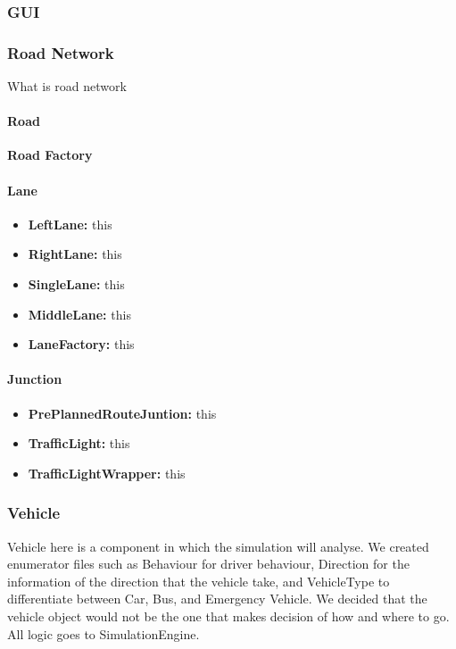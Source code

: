 \documentclass[11pt]{article}
\begin{document}
\subsubsection{GUI}

\subsubsection{Road Network}
What is road network
    \paragraph{Road}
    \textbf{Road Factory}\\
    \paragraph{Lane}
    \begin{itemize}[noitemsep]
    \item \textbf{LeftLane:} this  
    \item \textbf{RightLane:} this
    \item \textbf{SingleLane:} this
    \item \textbf{MiddleLane:} this  
    \item \textbf{LaneFactory:} this
    \end{itemize}
    \paragraph{Junction}
    \begin{itemize}[noitemsep]
    \item \textbf{PrePlannedRouteJuntion:} this  
    \item \textbf{TrafficLight:} this
    \item \textbf{TrafficLightWrapper:} this
    \end{itemize}
    
\subsubsection{Vehicle}
Vehicle here is a component in which the simulation will analyse. We created enumerator files such as Behaviour for driver behaviour, Direction for the information of the direction that the vehicle take, and VehicleType to differentiate between Car, Bus, and Emergency Vehicle. We decided that the vehicle object would not be the one that makes decision of how and where to go. All logic goes to SimulationEngine.
\end{document}
